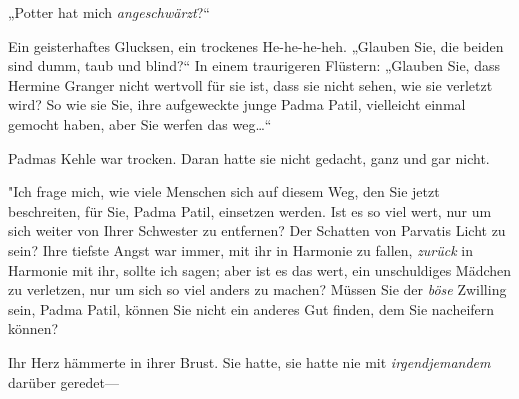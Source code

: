 „Potter hat mich \emph{angeschwärzt}?“

Ein geisterhaftes Glucksen, ein trockenes He-he-he-heh. „Glauben Sie, die beiden sind dumm, taub und blind?“ In einem traurigeren Flüstern: „Glauben Sie, dass Hermine Granger nicht wertvoll für sie ist, dass sie nicht sehen, wie sie verletzt wird? So wie sie Sie, ihre aufgeweckte junge Padma Patil, vielleicht einmal gemocht haben, aber Sie werfen das weg…“

Padmas Kehle war trocken. Daran hatte sie nicht gedacht, ganz und gar nicht.

"Ich frage mich, wie viele Menschen sich auf diesem Weg, den Sie jetzt beschreiten, für Sie, Padma Patil, einsetzen werden. Ist es so viel wert, nur um sich weiter von Ihrer Schwester zu entfernen? Der Schatten von Parvatis Licht zu sein? Ihre tiefste Angst war immer, mit ihr in Harmonie zu fallen, \emph{zurück} in Harmonie mit ihr, sollte ich sagen; aber ist es das wert, ein unschuldiges Mädchen zu verletzen, nur um sich so viel anders zu machen? Müssen Sie der \emph{böse} Zwilling sein, Padma Patil, können Sie nicht ein anderes Gut finden, dem Sie nacheifern können?

Ihr Herz hämmerte in ihrer Brust. Sie hatte, sie hatte nie mit \emph{irgendjemandem} darüber geredet—


